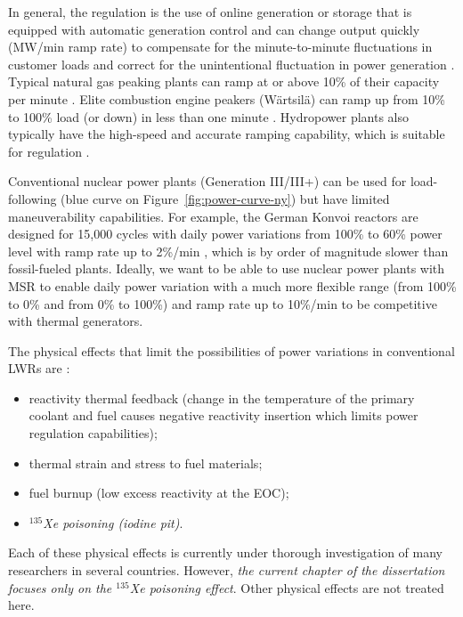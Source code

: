 In general, the regulation is the use of online generation or storage that is 
equipped with automatic generation control and can change output 
quickly (MW/min ramp rate) to compensate for the minute-to-minute 
fluctuations in customer loads and correct for the unintentional fluctuation 
in power generation \cite{kirby_method_2005}. Typical natural gas peaking 
plants can ramp at or above 10\% of their capacity per minute 
\cite{huff_enabling_2018}. Elite combustion engine peakers (W\"{a}rtsil\"{a}) 
can ramp up from 10\% to 100\% load (or down) in less than one minute 
\cite{wartsila_combustion_2020}. Hydropower plants also typically have the
high-speed and accurate ramping capability, which is suitable for regulation 
\cite{kirby_method_2005}.

Conventional nuclear power plants (Generation III/III+) can be used for 
load-following (blue curve on Figure~\ref{fig:power-curve-ny}) but have 
limited maneuverability capabilities. For example, the German Konvoi reactors 
are designed for 15,000 cycles with daily power variations from 100\% to 60\% 
power level with ramp rate up to 2\%/min \cite{ludwig_load_2011}, which is by 
order of magnitude slower than fossil-fueled plants. Ideally, we want to be 
able to use nuclear power plants with \gls{MSR} to enable daily power 
variation with a much more flexible range (from 100\% to 0\% and from 0\% to 
100\%) and ramp rate up to 10\%/min to be competitive with thermal generators.

The physical effects that limit the possibilities of power variations in 
conventional \glspl{LWR} are \cite{lokhov_technical_2011}:
\begin{itemize}[noitemsep, topsep=0pt]
	\item reactivity thermal feedback (change in the temperature of the 
	primary coolant and fuel causes negative reactivity insertion which limits 
	power regulation capabilities);
	\item thermal strain and stress to fuel materials;
	\item fuel burnup (low excess reactivity at the \gls{EOC});
	\item \emph{$^{135}$Xe poisoning (iodine pit)}.
\end{itemize}
Each of these physical effects is currently under 
thorough investigation of many researchers in several countries. However, 
\emph{the current chapter of the dissertation focuses only on the $^{135}$Xe  
poisoning effect}. Other physical effects are not treated here.

